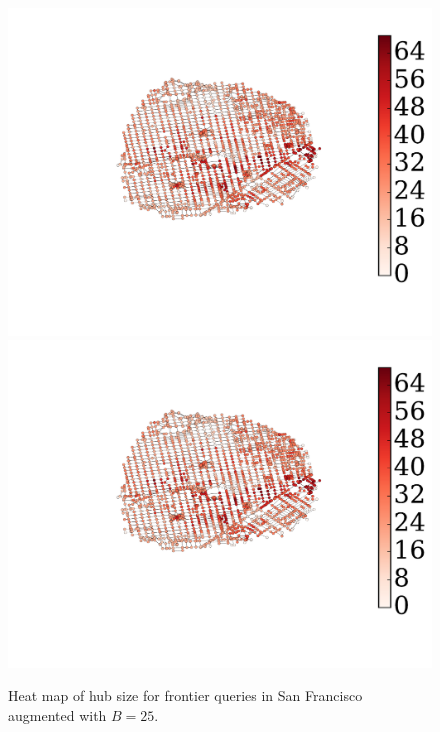 \begin{figure}
\begin{center}
\includegraphics[clip, trim=4.5cm 4.8cm 4.7cm 3cm,scale=0.8]{TexImg/SF_hub_sizes.pdf}
\includegraphics[clip, trim=15.8cm 0cm 0.4cm 1cm,scale=0.3]{TexImg/SF_hub_sizes.pdf}
\end{center}
\caption{Heat map of hub size for frontier queries in San Francisco augmented with $B=25$.}\label{fig:SF_hub_size_map}
\end{figure}

